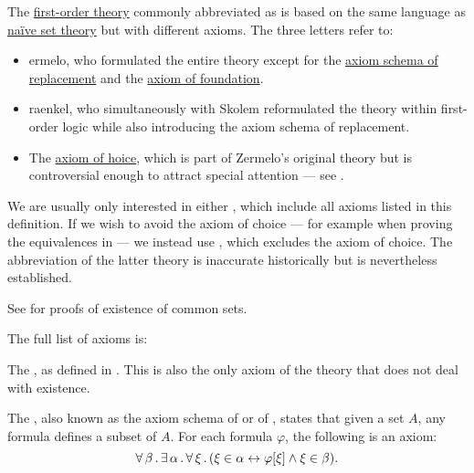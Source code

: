 \begin{definition}\label{def:zfc}
  The \hyperref[def:first_order_theory]{first-order theory} commonly abbreviated as  is based on the same language as \hyperref[def:naive_set_theory]{na\"ive set theory} but with different axioms. The three letters refer to:
  \begin{itemize}
    \item {}ermelo, who formulated the entire theory except for the \hyperref[def:zfc/replacement]{axiom schema of replacement} and the \hyperref[def:zfc/foundation]{axiom of foundation}.
    \item{} raenkel, who simultaneously with Skolem reformulated the theory within first-order logic while also introducing the axiom schema of replacement.
    \item The \hyperref[def:zfc/choice]{axiom of hoice}, which is part of Zermelo's original theory but is controversial enough to attract special attention --- see .
  \end{itemize}

  We are usually only interested in either , which include all axioms listed in this definition. If we wish to avoid the axiom of choice --- for example when proving the equivalences in  --- we instead use , which excludes the axiom of choice. The abbreviation of the latter theory is inaccurate historically but is nevertheless established.

  See  for proofs of existence of common sets.

  The full list of axioms is:
  \begin{thmenum}
     The , as defined in . This is also the only axiom of the theory that does not deal with existence.

     The , also known as the axiom schema of  or of , states that given a set \( A \), any formula defines a subset of \( A \). For each formula \( \varphi \), the following is an axiom:
    \begin{equation}\label{eq:def:naive_set_theory/unrestricted_comprehension}
      \forall \thinspace \beta \thinspace . \thinspace \exists \thinspace \alpha \thinspace . \thinspace \forall \thinspace \xi \thinspace . \thinspace (\xi \in \alpha \leftrightarrow \varphi[\xi] \wedge \xi \in \beta).
    \end{equation}


\end{thmenum}
\end{definition}

